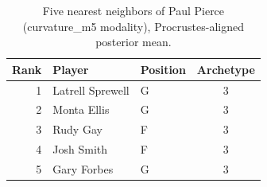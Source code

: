 \begin{table}[htbp]
  \centering\small
  \begin{tabular}{rllc}
    \toprule
    Rank & Player & Position & Archetype \\
    \midrule
    1 & Latrell Sprewell & G & 3 \\
    2 & Monta Ellis & G & 3 \\
    3 & Rudy Gay & F & 3 \\
    4 & Josh Smith & F & 3 \\
    5 & Gary Forbes & G & 3 \\
    \bottomrule
  \end{tabular}
  \caption{Five nearest neighbors of Paul Pierce (curvature_m5 modality), Procrustes-aligned posterior mean.}
  \label{tab:Paul_Pierce_neighbors_curvature_m5}
\end{table}

